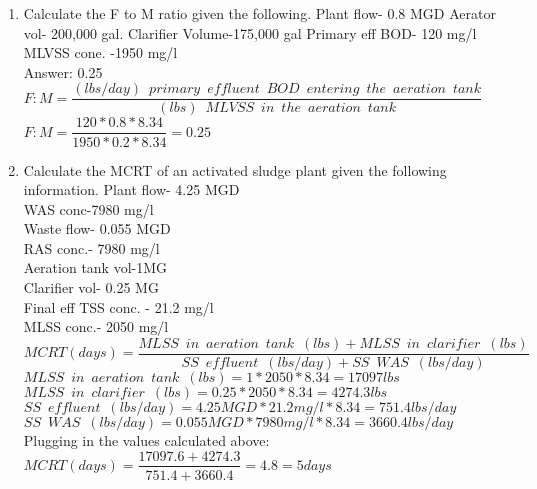 \begin{enumerate}
\item Calculate the F to M ratio given the following.
Plant flow- 0.8 MGD
Aerator vol- 200,000 gal.
Clarifier Volume-175,000 gal
Primary eff BOD- 120 mg/l
MLVSS cone. -1950 mg/l\\
Answer:  0.25\\
\vspace{0.3cm}
$F:M=\dfrac{(lbs/day) \enspace primary \enspace effluent  \enspace BOD \enspace entering \enspace the  \enspace aeration \enspace tank}{(lbs) \enspace MLVSS \enspace in \enspace the  \enspace aeration \enspace tank}$\\
\vspace{0.3cm}
$F:M=\dfrac{120*0.8*8.34}{1950*0.2*8.34}=\boxed{0.25}$\\
\item Calculate the MCRT of an activated sludge plant given the following information.
Plant flow- 4.25 MGD\\
WAS conc-7980 mg/l\\
Waste flow- 0.055 MGD\\
RAS conc.- 7980 mg/l\\
Aeration tank vol-1MG\\  
Clarifier vol- 0.25 MG\\
Final eff TSS conc. - 21.2 mg/l\\
MLSS conc.- 2050 mg/l\\
$MCRT (days) =  \dfrac{MLSS \enspace in \enspace aeration \enspace tank \enspace (lbs)+MLSS \enspace in \enspace clarifier \enspace (lbs)}{SS \enspace effluent \enspace (lbs/day)+SS \enspace WAS \enspace (lbs/day)}$\\
\vspace{0.3cm} 
$MLSS \enspace in \enspace aeration \enspace tank \enspace (lbs)=1*2050*8.34=17097lbs$\\
\vspace{0.3cm} 
$MLSS \enspace in \enspace clarifier \enspace (lbs)=0.25*2050*8.34=4274.3lbs$\\
\vspace{0.3cm} 
$SS \enspace effluent \enspace (lbs/day)=4.25MGD *21.2mg/l*8.34=751.4lbs/day$\\
\vspace{0.3cm} 
$SS \enspace WAS \enspace (lbs/day)=0.055MGD *7980mg/l*8.34=3660.4lbs/day$\\
\vspace{0.3cm} 
Plugging in the values calculated above: $MCRT (days) =  \dfrac{17097.6+4274.3}{751.4+3660.4}=4.8=\boxed{5days}$\\
\vspace{0.2cm}



\end{enumerate}
